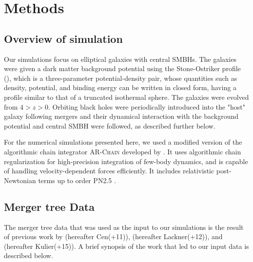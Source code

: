 \documentclass[english, apj]{emulateapj}
\begin{document}
\section{Methods}\label{sec:methods}

\subsection{Overview of simulation}
Our simulations focus on elliptical galaxies with central SMBHs. The galaxies were given a dark matter background potential using the Stone-Ostriker profile (\citet{2015ApJ...806L..28S}), which is a three-parameter potential-density pair, whose quantities such as density, potential, and binding energy can be written in closed form, having a profile similar to that of a truncated isothermal sphere.  The galaxies were evolved from $4 > z > 0$.  Orbiting black holes were periodically introduced into the "host" galaxy following mergers and their dynamical interaction with the background potential and central SMBH were followed, as described further below.

For the numerical simulations presented here, we used a modified version of the algorithmic chain integrator \textsc{AR-Chain} developed by \citet{2006MNRAS.372..219M}. It uses algorithmic chain regularization for high-precision integration of few-body dynamics, and is capable of handling velocity-dependent forces efficiently. It includes relativistic post-Newtonian terms up to order PN2.5 \citep{2008AJ....135.2398M}.


\subsection{Merger tree Data}
The merger tree data that was used as the input to our simulations is the result of previous work by \citet{2011ApJ...741...99C, 2011ApJ...742L..33C, 2012ApJ...753...17C, 2012ApJ...748..121C, 2013ApJ...770..139C} (hereafter Cen(+11)), \citet{2012MNRAS.425..641L} (hereafter Lackner(+12)), and \citet{2015ApJ...799..178K} (hereafter Kulier(+15)).  A brief synopsis of the work that led to our input data is described below.
\end{document}
